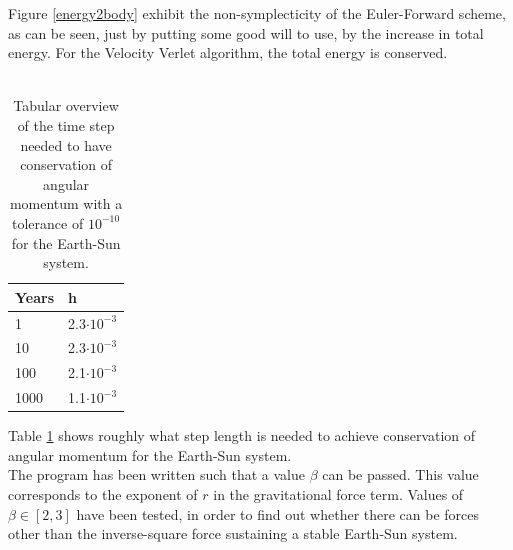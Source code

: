     Figure \ref{energy2body} exhibit the non-symplecticity of the Euler-Forward scheme, as can be seen, just by putting some good will to use, by the increase in total energy. For the Velocity Verlet algorithm, the total energy is conserved. \\ \\
    
    \begin{table}[H]
		\centering
		\caption{Tabular overview of the time step needed to have conservation of angular momentum with a tolerance of $10^{-10}$ for the Earth-Sun system.}
		\label{conservationtable}
		\begin{tabular}{|l|l|}
		    \hline
			Years & h\\
			\hline
			1 & 2.3$\cdot 10^{-3}$\\
			10 & 2.3$\cdot 10^{-3}$\\
			100 & 2.1$\cdot 10^{-3}$\\
			1000 & 1.1$\cdot 10^{-3}$\\
			\hline
		\end{tabular}
	\end{table}
	
   Table \ref{conservationtable} shows roughly what step length is needed to achieve conservation of angular momentum for the Earth-Sun system. \\
   
   The program has been written such that a value $\beta$ can be passed. This value corresponds to the exponent of $r$ in the gravitational force term. Values of $\beta \in [2,3]$ have been tested, in order to find out whether there can be forces other than the inverse-square force sustaining a stable Earth-Sun system. 

